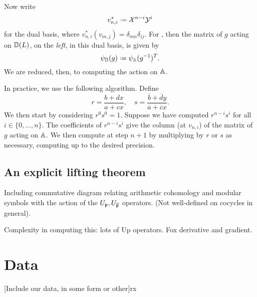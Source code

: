 \documentclass[a4paper,11pt]{article}
\numberwithin{equation}{section}
\begin{document}
Now write
\[
	v_{n,i}^* \defeq \mathcal{X}^{n-i}\mathcal{Y}^i
\]
for the dual basis, where $v_{n,i}^*(v_{m,j}) = \delta_{mn}\delta_{ij}.$ For , then the matrix of $g$ acting on $\mathbb{D}(L)$, on the \emph{left}, in this dual basis, is given by 
\[
	\psi_{\D}(g) \defeq \psi_{\A}(g^{-1})^T.
\]
We are reduced, then, to computing the action on $\mathbb{A}$.

In practice, we use the following algorithm. Define 
\[
	r = \frac{b+dx}{a+cx}, \hspace{12pt} s = \frac{\overline{b}+\overline{d}y}{\overline{a}+\overline{c}x}.
\]
We then start by considering $r^0s^0 = 1$. Suppose we have computed $r^{n-i}s^i$ for all $i \in \{0,...,n\}.$ The coefficients of $r^{n-i}s^i$ give the column (at $v_{n,i}$) of the matrix of $g$ acting on $\mathbb{A}$. We then compute at step $n+1$ by multiplying by $r$ or $s$ as necessary, computing up to the desired precision.


\subsection{An explicit lifting theorem}
Including commutative diagram relating arithmetic cohomology and modular symbols with the action of the $U_{\mathfrak{p}}, U_{\overline{\mathfrak{p}}}$ operators. (Not well-defined on cocycles in general).


Complexity in computing this: lots of Up operators. Fox derivative and gradient.


\section{Data}
[Include our data, in some form or other]rx


\footnotesize
\renewcommand{\refname}{\normalsize References} 
{}


\Addresses
\end{document}

